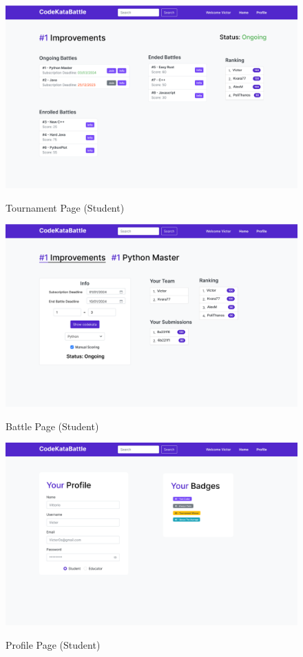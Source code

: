 \documentclass{Configuration_Files/Template}
\begin{document}
\begin{figure}[H]
\centering
\includegraphics[scale = 0.25]{DD_latex/Images/UI/TournamentPage_Student.png}\\
\caption{Tournament Page (Student)}
\end{figure}

\begin{figure}[H]
\centering
\includegraphics[scale = 0.25]{DD_latex/Images/UI/BattlePage_Student.png}\\
\caption{Battle Page (Student)}
\end{figure}

\begin{figure}[H]
\centering
\includegraphics[scale = 0.25]{DD_latex/Images/UI/Profile_Student.png}\\
\caption{Profile Page (Student) }
\end{figure}
\end{document}
